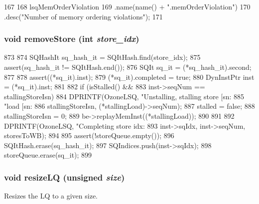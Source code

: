 \begin{DoxyCode}
167 {
168     lsqMemOrderViolation
169         .name(name() + ".memOrderViolation")
170         .desc("Number of memory ordering violations");
171 }
\end{DoxyCode}
\hypertarget{classOzoneLWLSQ_ad5ff9e08c63a01ac86a8f80765b37365}{
\subsubsection[{removeStore}]{\setlength{\rightskip}{0pt plus 5cm}void removeStore (int {\em store\_\-idx})}}
\label{classOzoneLWLSQ_ad5ff9e08c63a01ac86a8f80765b37365}



\begin{DoxyCode}
873 {
874     SQHashIt sq_hash_it = SQItHash.find(store_idx);
875     assert(sq_hash_it != SQItHash.end());
876     SQIt sq_it = (*sq_hash_it).second;
877 
878     assert((*sq_it).inst);
879     (*sq_it).completed = true;
880     DynInstPtr inst = (*sq_it).inst;
881 
882     if (isStalled() &&
883         inst->seqNum == stallingStoreIsn) {
884         DPRINTF(OzoneLSQ, "Unstalling, stalling store [sn:%
885                 "load [sn:%
886                 stallingStoreIsn, (*stallingLoad)->seqNum);
887         stalled = false;
888         stallingStoreIsn = 0;
889         be->replayMemInst((*stallingLoad));
890     }
891 
892     DPRINTF(OzoneLSQ, "Completing store idx:%
893             inst->sqIdx, inst->seqNum, storesToWB);
894 
895     assert(!storeQueue.empty());
896     SQItHash.erase(sq_hash_it);
897     SQIndices.push(inst->sqIdx);
898     storeQueue.erase(sq_it);
899 }
\end{DoxyCode}
\hypertarget{classOzoneLWLSQ_a3bc9500810cb2d5615e29206e2d6499f}{
\subsubsection[{resizeLQ}]{\setlength{\rightskip}{0pt plus 5cm}void resizeLQ (unsigned {\em size})}}
\label{classOzoneLWLSQ_a3bc9500810cb2d5615e29206e2d6499f}
Resizes the LQ to a given size. 


